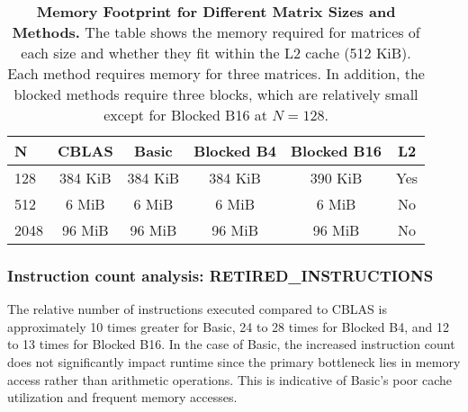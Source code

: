 \begin{table}[htbp]
    \centering
    \begin{tabular}{lccccc}
    \toprule
    N &  CBLAS &  Basic &  Blocked B4 &  Blocked B16 & L2 \\
    \midrule
    128  & 384 KiB & 384 KiB & 384 KiB & 390 KiB & Yes \\
    512  & 6 MiB   & 6 MiB   & 6 MiB   & 6 MiB   & No  \\
    2048 & 96 MiB  & 96 MiB  & 96 MiB  & 96 MiB  & No  \\
    \bottomrule
    \end{tabular}
    \caption{\textbf{Memory Footprint for Different Matrix Sizes and Methods.} The table shows the memory required for matrices of each size and whether they fit within the L2 cache (512 KiB). Each method requires memory for three matrices. In addition, the blocked methods require three blocks, which are relatively small except for Blocked B16 at \(N = 128\).}
    \label{tab:memory-footprint}
\end{table}


\FloatBarrier
\subsubsection{Instruction count analysis: RETIRED\_INSTRUCTIONS}
\label{subsubsec:instruction-count}

The relative number of instructions executed compared to CBLAS is approximately 10 times greater for Basic, 24 to 28 times for Blocked B4, and 12 to 13 times for Blocked B16. In the case of Basic, the increased instruction count does not significantly impact runtime since the primary bottleneck lies in memory access rather than arithmetic operations. This is indicative of Basic's poor cache utilization and frequent memory accesses.

